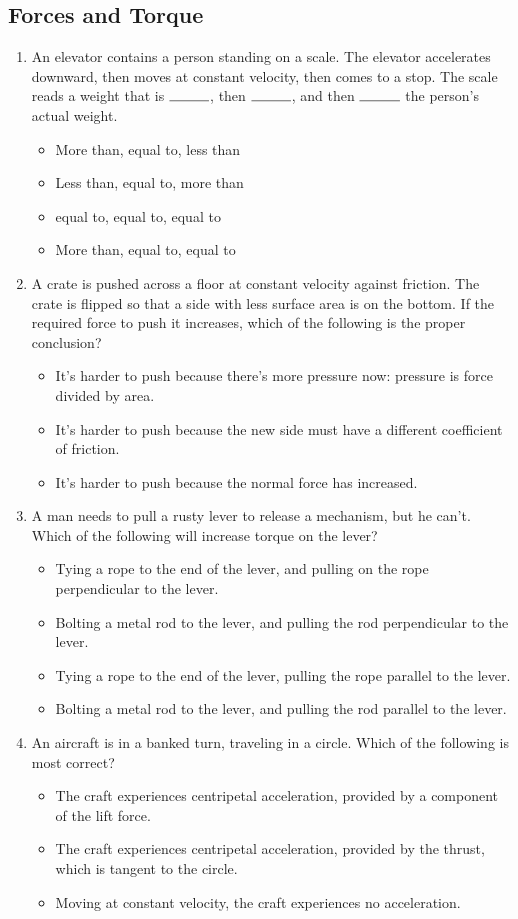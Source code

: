 \documentclass[10pt]{article}
\begin{document}
\subsection{Forces and Torque}
\begin{enumerate}
\item An elevator contains a person standing on a scale.  The elevator accelerates downward, then moves at constant velocity, then comes to a stop.  The scale reads a weight that is $\rule{1cm}{0.15mm}$, then $\rule{1cm}{0.15mm}$, and then $\rule{1cm}{0.15mm}$ the person's actual weight.
\begin{itemize}
\item More than, equal to, less than
\item Less than, equal to, more than
\item equal to, equal to, equal to
\item More than, equal to, equal to
\end{itemize}
\item A crate is pushed across a floor at constant velocity against friction.  The crate is flipped so that a side with less surface area is on the bottom.  If the required force to push it increases, which of the following is the proper conclusion?
\begin{itemize}
\item It's harder to push because there's more pressure now: pressure is force divided by area.
\item It's harder to push because the new side must have a different coefficient of friction.
\item It's harder to push because the normal force has increased.
\end{itemize}
\item A man needs to pull a rusty lever to release a mechanism, but he can't.  Which of the following will increase torque on the lever?
\begin{itemize}
\item Tying a rope to the end of the lever, and pulling on the rope perpendicular to the lever.
\item Bolting a metal rod to the lever, and pulling the rod perpendicular to the lever.
\item Tying a rope to the end of the lever, pulling the rope parallel to the lever.
\item Bolting a metal rod to the lever, and pulling the rod parallel to the lever.
\end{itemize}
\item An aircraft is in a banked turn, traveling in a circle.  Which of the following is most correct?
\begin{itemize}
\item The craft experiences centripetal acceleration, provided by a component of the lift force.
\item The craft experiences centripetal acceleration, provided by the thrust, which is tangent to the circle.
\item Moving at constant velocity, the craft experiences no acceleration.
\end{itemize}
\end{enumerate}
\end{document}
